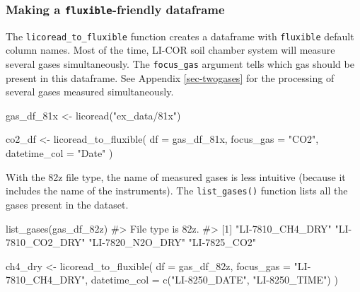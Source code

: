 \documentclass[
  letterpaper,
  DIV=11,
  numbers=noendperiod]{scrartcl}
\newenvironment{Shaded}{\begin{snugshade}}{\end{snugshade}}
\newcommand{\AttributeTok}[1]{\textcolor[rgb]{0.40,0.45,0.13}{#1}}
\newcommand{\CommentTok}[1]{\textcolor[rgb]{0.37,0.37,0.37}{#1}}
\newcommand{\FunctionTok}[1]{\textcolor[rgb]{0.28,0.35,0.67}{#1}}
\newcommand{\NormalTok}[1]{\textcolor[rgb]{0.00,0.23,0.31}{#1}}
\newcommand{\OtherTok}[1]{\textcolor[rgb]{0.00,0.23,0.31}{#1}}
\newcommand{\StringTok}[1]{\textcolor[rgb]{0.13,0.47,0.30}{#1}}
\begin{document}
\subsubsection{\texorpdfstring{Making a \texttt{fluxible}-friendly
dataframe}{Making a fluxible-friendly dataframe}}\label{making-a-fluxible-friendly-dataframe}

The \texttt{licoread\_to\_fluxible} function creates a dataframe with
\texttt{fluxible} default column names. Most of the time, LI-COR soil
chamber system will measure several gases simultaneously. The
\texttt{focus\_gas} argument tells which gas should be present in this
dataframe. See Appendix \ref{sec-twogases} for the processing of several
gases measured simultaneously.

\begin{Shaded}
\begin{Highlighting}[]
\NormalTok{gas\_df\_81x }\OtherTok{\textless{}{-}} \FunctionTok{licoread}\NormalTok{(}\StringTok{"ex\_data/81x"}\NormalTok{)}

\NormalTok{co2\_df }\OtherTok{\textless{}{-}} \FunctionTok{licoread\_to\_fluxible}\NormalTok{(}
  \AttributeTok{df =}\NormalTok{ gas\_df\_81x,}
  \AttributeTok{focus\_gas =} \StringTok{"CO2"}\NormalTok{,}
  \AttributeTok{datetime\_col =} \StringTok{"Date"}
\NormalTok{)}
\end{Highlighting}
\end{Shaded}

With the 82z file type, the name of measured gases is less intuitive
(because it includes the name of the instruments). The
\texttt{list\_gases()} function lists all the gases present in the
dataset.

\begin{Shaded}
\begin{Highlighting}[]
\FunctionTok{list\_gases}\NormalTok{(gas\_df\_82z)}
\CommentTok{\#\textgreater{} File type is 82z.}
\CommentTok{\#\textgreater{} [1] "LI{-}7810\_CH4\_DRY" "LI{-}7810\_CO2\_DRY" "LI{-}7820\_N2O\_DRY" "LI{-}7825\_CO2"}
\end{Highlighting}
\end{Shaded}

\begin{Shaded}
\begin{Highlighting}[]
\NormalTok{ch4\_dry }\OtherTok{\textless{}{-}} \FunctionTok{licoread\_to\_fluxible}\NormalTok{(}
  \AttributeTok{df =}\NormalTok{ gas\_df\_82z,}
  \AttributeTok{focus\_gas =} \StringTok{"LI{-}7810\_CH4\_DRY"}\NormalTok{,}
  \AttributeTok{datetime\_col =} \FunctionTok{c}\NormalTok{(}\StringTok{"LI{-}8250\_DATE"}\NormalTok{, }\StringTok{"LI{-}8250\_TIME"}\NormalTok{)}
\NormalTok{)}
\end{Highlighting}
\end{Shaded}
\end{document}

